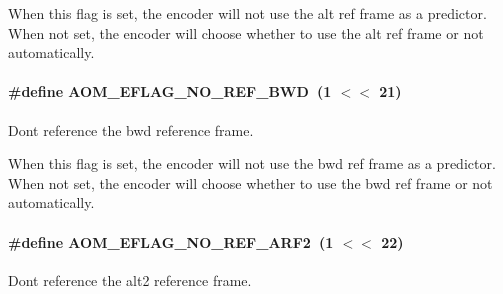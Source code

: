 When this flag is set, the encoder will not use the alt ref frame as a predictor. When not set, the encoder will choose whether to use the alt ref frame or not automatically. 
\paragraph[{\texorpdfstring{A\+O\+M\+\_\+\+E\+F\+L\+A\+G\+\_\+\+N\+O\+\_\+\+R\+E\+F\+\_\+\+B\+WD}{AOM_EFLAG_NO_REF_BWD}}]{\setlength{\rightskip}{0pt plus 5cm}\#define A\+O\+M\+\_\+\+E\+F\+L\+A\+G\+\_\+\+N\+O\+\_\+\+R\+E\+F\+\_\+\+B\+WD~(1 $<$$<$ 21)}\hypertarget{group__aom__encoder_ga758649aa6cd9fefb15ad888489884a38}{}\label{group__aom__encoder_ga758649aa6cd9fefb15ad888489884a38}


Don\textquotesingle{}t reference the bwd reference frame. 

When this flag is set, the encoder will not use the bwd ref frame as a predictor. When not set, the encoder will choose whether to use the bwd ref frame or not automatically. 
\paragraph[{\texorpdfstring{A\+O\+M\+\_\+\+E\+F\+L\+A\+G\+\_\+\+N\+O\+\_\+\+R\+E\+F\+\_\+\+A\+R\+F2}{AOM_EFLAG_NO_REF_ARF2}}]{\setlength{\rightskip}{0pt plus 5cm}\#define A\+O\+M\+\_\+\+E\+F\+L\+A\+G\+\_\+\+N\+O\+\_\+\+R\+E\+F\+\_\+\+A\+R\+F2~(1 $<$$<$ 22)}\hypertarget{group__aom__encoder_gad04799a74215e1b9609f7ccd1766f8c9}{}\label{group__aom__encoder_gad04799a74215e1b9609f7ccd1766f8c9}


Don\textquotesingle{}t reference the alt2 reference frame. 

